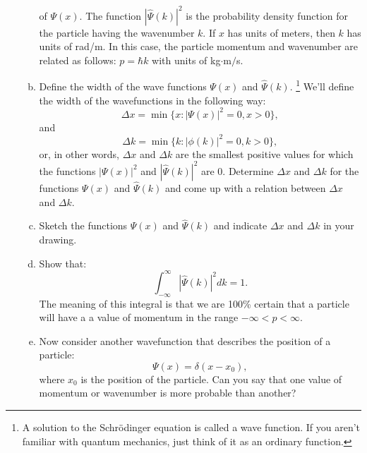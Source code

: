 \begin{enumerate}
\begin{enumerate}[a)]
{} of $\Psi(x)$. The function $|\hat{\Psi}(k)|^{2}$ is the probability
density function for the particle having the wavenumber $k$. If $x$
has units of meters, then $k$ has units of rad/m. In this case, the
particle momentum and wavenumber are related as follows:
$p = \hbar k$ with units of kg$\cdot$m$/$s.

\item Define the width of the wave functions $\Psi(x)$ and $\hat{\Psi}(k)$.
\footnote{A solution to the Schrödinger equation is called a wave function. If you aren't familiar with quantum mechanics, just think of it as an ordinary function.} We'll define the width of the wavefunctions in the following way:
$$\Delta x = \min\{x : |\Psi(x)|^{2}=0,x>0\},$$
and 
$$\Delta k = \min\{k : |\phi(k)|^{2}=0,k>0\},$$
or, in other words, $\Delta x$ and $\Delta k$ are the smallest positive values for which the functions $|\Psi(x)|^{2}$ and $|\hat{\Psi}(k)|^{2}$ are $0$. Determine $\Delta x$ and $\Delta k$ for the functions $\Psi(x)$ and $\hat{\Psi}(k)$ and come up with a relation between $\Delta x$ and $\Delta k$.

\item Sketch the functions $\Psi(x)$ and $\hat{\Psi}(k)$ and indicate $\Delta x$ and $\Delta k$ in your drawing. 

\item Show that:
$$\int_{-\infty}^{\infty} |\hat{\Psi}(k)|^{2}dk=1.$$ The meaning of this
integral is that we are 100\% certain that a particle will have a
a value of momentum in the range $-\infty<p<\infty$.

\item Now consider another wavefunction that describes the position of a particle:
\begin{equation}
\Psi(x) = \delta(x-x_0),
\end{equation}
where $x_0$ is the position of the particle. Can you say that one
value of momentum or wavenumber is more probable than another?

\end{enumerate}



\end{enumerate}
